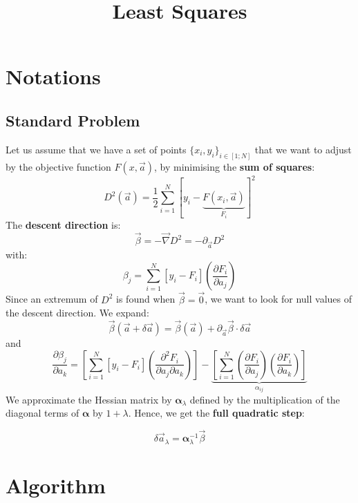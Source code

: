 \documentclass[aps]{revtex4}
\newcommand{\mymat}[1]{\boldsymbol{#1}}
\newcommand{\mygrad}{\vec{\nabla}}
\begin{document}
\title{Least Squares}
\maketitle
	
\section{Notations}

\subsection{Standard Problem}
Let us assume that we have a set of points $\lbrace x_i, y_i \rbrace_{i\in[1;N]}$ that we want to adjust by
the objective function $F(x,\vec{a})$, by minimising the \textbf{sum of squares}:
\begin{equation}
	D^2(\vec{a}) = \frac{1}{2} \sum_{i=1}^{N}  \left[ y_i - \underbrace{F(x_i,\vec{a})}_{F_i} \right] ^2 
\end{equation}
The \textbf{descent direction} is:
\begin{equation}
	\vec{\beta} = -\mygrad D^2 = -\partial_{\vec{a}} D^2
\end{equation}
with:
\begin{equation}
	\beta_j = \sum_{i=1}^{N} \left[y_i - F_i\right] \left(\dfrac{\partial F_i}{\partial a_j}\right)
\end{equation}
Since an extremum of $D^2$ is found when $\vec{\beta}=\vec{0}$, we want to look for null values of the
descent direction. We expand:
\begin{equation}
	\vec{\beta}\left(\vec{a}+\delta\vec{a}\right) = \vec{\beta}\left(\vec{a}\right) + \partial_{\vec{a}}\vec{\beta} \cdot \delta\vec{a}
\end{equation}
and
\begin{equation}
	\dfrac{\partial \beta_j}{\partial a_k} =  \left[\sum_{i=1}^{N} \left[y_i - F_i\right] \left(\dfrac{\partial^2 F_i}{\partial a_j\partial a_k}\right) \right] - 
	\underbrace{\left[ \sum_{i=1}^N \left(\dfrac{\partial F_i}{\partial a_j}\right) \left(\dfrac{\partial F_i}{\partial a_k}\right)\right]}_{\alpha_{ij}}
\end{equation}
We approximate the Hessian matrix by $\mymat{\alpha}_{\lambda}$ defined by the multiplication of the diagonal terms of $\mymat{\alpha}$ by $1+\lambda$.
Hence, we get the \textbf{full quadratic step}:

\begin{equation}
	\delta\vec{a}_\lambda = \mymat{\alpha}_\lambda^{-1} \vec{\beta}
\end{equation}


\section{Algorithm}
\end{document}
